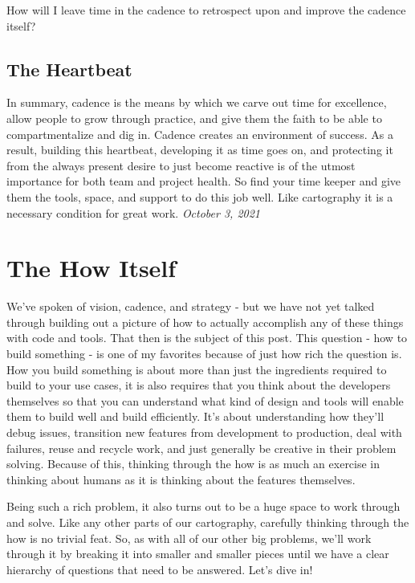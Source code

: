\documentclass[10pt,a5paper]{book}
\begin{document}
How will I leave time in the cadence to retrospect upon and improve the cadence itself?

\subsection{The Heartbeat}
In summary, cadence is the means by which we carve out time for excellence, allow people to grow through practice, and give them the faith to be able to compartmentalize and dig in. Cadence creates an environment of success. As a result, building this heartbeat, developing it as time goes on, and protecting it from the always present desire to just become reactive is of the utmost importance for both team and project health. So find your time keeper and give them the tools, space, and support to do this job well. Like cartography it is a necessary condition for great work. 
\textit{October 3, 2021}

\section{The How Itself}
We've spoken of vision, cadence, and strategy - but we have not yet talked through building out a picture of how to actually accomplish any of these things with code and tools. That then is the subject of this post. This question - how to build something - is one of my favorites because of just how rich the question is. How you build something is about more than just the ingredients required to build to your use cases, it is also requires that you think about the developers themselves so that you can understand what kind of design and tools will enable them to build well and build efficiently. It's about understanding how they'll debug issues, transition new features from development to production, deal with failures, reuse and recycle work, and just generally be creative in their problem solving. Because of this, thinking through the how is as much an exercise in thinking about humans as it is thinking about the features themselves. 

Being such a rich problem, it also turns out to be a huge space to work through and solve. Like any other parts of our cartography, carefully thinking through the how is no trivial feat. So, as with all of our other big problems, we'll work through it by breaking it into smaller and smaller pieces until we have a clear hierarchy of questions that need to be answered. Let's dive in!
\end{document}
